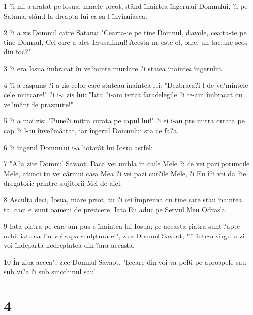 \par 1 ?i mi-a aratat pe Iosua, marele preot, stând înaintea îngerului Domnului, ?i pe Satana, stând la dreapta lui ca sa-l învinuiasca.
\par 2 ?i a zis Domnul catre Satana: "Cearta-te pe tine Domnul, diavole, cearta-te pe tine Domnul, Cel care a ales Ierusalimul! Acesta nu este el, oare, un taciune scos din foc?"
\par 3 ?i era Iosua îmbracat în ve?minte murdare ?i statea înaintea îngerului.
\par 4 ?i a raspuns ?i a zis celor care stateau înaintea lui: "Dezbraca?i-l de ve?mintele cele murdare!" ?i i-a zis lui: "Iata ?i-am iertat faradelegile ?i te-am îmbracat cu ve?mânt de praznuire!"
\par 5 ?i a mai zis: "Pune?i mitra curata pe capul lui!" ?i ei i-au pus mitra curata pe cap ?i l-au înve?mântat, iar îngerul Domnului sta de fa?a.
\par 6 ?i îngerul Domnului i-a hotarât lui Iosua astfel:
\par 7 "A?a zice Domnul Savaot: Daca vei umbla în caile Mele ?i de vei pazi poruncile Mele, atunci tu vei cârmui casa Mea ?i vei pazi cur?ile Mele, ?i Eu î?i voi da ?ie dregatorie printre slujitorii Mei de aici.
\par 8 Asculta deci, Iosua, mare preot, tu ?i cei împreuna cu tine care stau înaintea ta; caci ei sunt oameni de prezicere. Iata Eu aduc pe Servul Meu Odrasla.
\par 9 Iata piatra pe care am pus-o înaintea lui Iosua; pe aceasta piatra sunt ?apte ochi: iata ca Eu voi sapa sculptura ei", zice Domnul Savaot, "?i într-o singura zi voi îndeparta nedreptatea din ?ara aceasta.
\par 10 În ziua aceea", zice Domnul Savaot, "fiecare din voi va pofti pe aproapele sau sub vi?a ?i sub smochinul sau".

\chapter{4}

